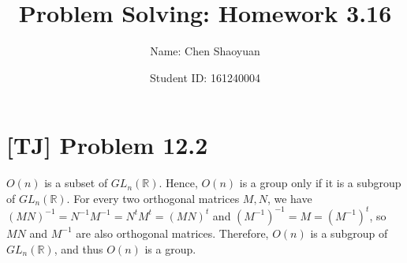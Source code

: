 \documentclass[a4paper,11pt,twocolumn]{article}
\newcommand{\homeworkno}{3.16}
\begin{document}
  \title{Problem Solving: Homework \homeworkno}
  \author{Name: Chen Shaoyuan \and Student ID: 161240004}
  \maketitle

  \section{[TJ] Problem 12.2}
  $O(n)$ is a subset of $GL_n(\mathbb{R})$. Hence, $O(n)$ is a group only if it is a subgroup of $GL_n(\mathbb{R})$. For every two orthogonal matrices $M, N$, we have $(MN)^{-1} = N^{-1}M^{-1} = N^t M^t = (MN)^t$ and $(M^{-1})^{-1} = M = (M^{-1})^t$, so $MN$ and $M^{-1}$ are also orthogonal matrices. Therefore, $O(n)$ is a subgroup of $GL_n(\mathbb{R})$, and thus $O(n)$ is a group.
\end{document}
